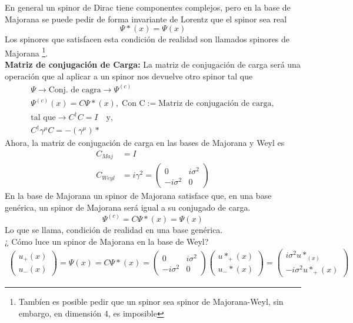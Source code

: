 \documentclass[../main.tex]{subfiles}
\begin{document}
En general un spinor de Dirac tiene componentes complejos, pero en la base de Majorana se puede pedir de forma invariante de Lorentz que el spinor sea real
\begin{equation}
  \Psi*(x) = \Psi(x)
 \end{equation}
Los spinores que satisfacen esta condición de realidad son llamados spinores de Majorana \footnote{Tambíen es posible pedir que un spinor sea spinor de Majorana-Weyl, sin embargo, en dimensión 4, es imposible}. \\
\textbf{Matriz de conjugación de Carga:} La matriz de conjugación de carga será una operación que al aplicar a un spinor nos devuelve otro spinor tal que
\begin{align*}
  \Psi \longrightarrow \text{Conj. de cagra} \longrightarrow \Psi^{(c)} \\
\Psi^{(c)}(x) = C\Psi*(x), \;\text{Con C}:=\text{Matriz de conjugación de carga}, \\
  \text{tal que} \rightarrow C^\dagger C = I \quad \text{y}, \\
  C^\dagger \gamma^\mu C = - \left( \gamma^\mu \right)*
\end{align*}
Ahora, la matriz de conjugación de carga en las bases de Majorana y Weyl es
\begin{align*}
  C_{Maj} & = I \\
  C_{Weyl} & = i \gamma^2 = \begin{pmatrix}
    0 & i\sigma^2 \\ -i\sigma^2 & 0
  \end{pmatrix}
\end{align*}
En la base de Majorana un spinor de Majorana satisface que, en una base genérica, un spinor de Majorana será igual a su conjugado de carga.
\begin{equation}
  \Psi^{(c)} = C \Psi*(x) = \Psi(x)
 \end{equation}
Lo que se llama, condición de realidad en una base genérica. \\
¿ Cómo luce un spinor de Majorana en la base de Weyl?
\begin{align*}
  \begin{pmatrix}
    u_+(x) \\ u_-(x)
  \end{pmatrix} = \Psi(x) = C\Psi*(x) = \begin{pmatrix}
    0 & i\sigma^2 \\ -i\sigma^2 & 0
  \end{pmatrix} 
  \begin{pmatrix}
    u*_+(x) \\ u_-*(x)
  \end{pmatrix} = 
  \begin{pmatrix}
    i\sigma^2 u*_(x) \\ -i\sigma^2 u*_+(x)
  \end{pmatrix}
\end{align*}
\end{document}
